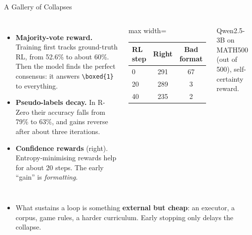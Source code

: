 \begin{frame}[fragile]{A Gallery of Collapses}
    \begin{columns}[T,onlytextwidth]
        \begin{itemize}\itemsep0.45em
            \item \textbf{Majority-vote reward.} Training first tracks ground-truth RL, from 52.6\% to about 60\%. Then the model finds the perfect consensus: it answers \verb|\boxed{1}| to everything.
            \item \textbf{Pseudo-labels decay.} In R-Zero their accuracy falls from 79\% to 63\%, and gains reverse after about three iterations.
            \item \textbf{Confidence rewards} (right). Entropy-minimising rewards help for about 20 steps. The early ``gain'' is \emph{formatting}.
        \end{itemize}
        \centering
        \small
        \begin{adjustbox}{max width=\linewidth}\begin{tabular}{lcc}
            \toprule
            \textbf{RL step} & \textbf{Right} & \textbf{Bad format} \\
            \midrule
            0 & 291 & 67 \\
            20 & 289 & 3 \\
            \rowcolor{KAred!10} 40 & 235 & 2 \\
            \bottomrule
        \end{tabular}\end{adjustbox}

        \vspace{0.4em}
        {\scriptsize Qwen2.5-3B on MATH500 (out of 500), self-certainty reward.}
    \end{columns}
    \vspace{0.3em}
    \begin{itemize}\itemsep0.4em
        \item What sustains a loop is something \textbf{external but cheap}: an executor, a corpus, game rules, a harder curriculum. Early stopping only delays the collapse.
    \end{itemize}
\end{frame}

